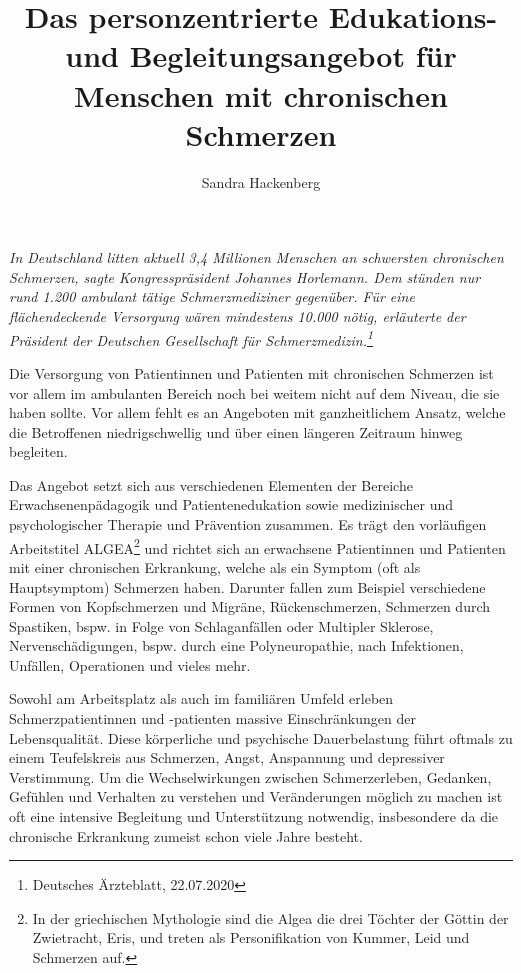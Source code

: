 \documentclass[
  parskip=half,
  DIV=11,
]{scrartcl}
\title{
    Das personzentrierte Edukations- und Begleitungsangebot für Menschen mit chronischen Schmerzen
    \textquote{ALGEA}
}
\author{Sandra Hackenberg}
\begin{document}
\maketitle

\begin{displayquote}\itshape In Deutschland litten aktuell 3,4 Millionen Menschen an schwersten
    chronischen Schmerzen, sagte Kongresspräsident Johannes Horlemann. Dem stünden nur rund 1.200
    ambulant tätige Schmerzmediziner gegenüber. Für eine flächendeckende Versorgung wären mindestens
    10.000 nötig, erläuterte der Präsident der Deutschen Gesellschaft für
    Schmerzmedizin.\footnote{Deutsches Ärzteblatt, 22.07.2020}
\end{displayquote}

\begin{multicols}{2}
Die Versorgung von Patientinnen und Patienten mit chronischen Schmerzen ist vor allem im ambulanten
Bereich noch bei weitem nicht auf dem Niveau, die sie haben sollte. Vor allem fehlt es an Angeboten
mit ganzheitlichem Ansatz, welche die Betroffenen niedrigschwellig und über einen längeren Zeitraum
hinweg begleiten.

Das Angebot setzt sich aus verschiedenen Elementen der Bereiche Erwachsenenpädagogik und Patientenedukation sowie medizinischer und psychologischer Therapie und Prävention zusammen.  Es trägt den
vorläufigen Arbeitstitel ALGEA\footnote{In der griechischen Mythologie sind die Algea die drei
Töchter der Göttin der Zwietracht, Eris, und treten als Personifikation von Kummer, Leid und
Schmerzen auf.} und richtet sich an erwachsene Patientinnen und Patienten mit einer chronischen
Erkrankung, welche als ein Symptom (oft als Hauptsymptom) Schmerzen haben. Darunter fallen zum
Beispiel verschiedene Formen von Kopfschmerzen und Migräne, Rückenschmerzen, Schmerzen durch
Spastiken, bspw. in Folge von Schlaganfällen oder Multipler Sklerose, Nervenschädigungen, bspw.
durch eine Polyneuropathie, nach Infektionen, Unfällen, Operationen und vieles mehr.

Sowohl am Arbeitsplatz als auch im familiären Umfeld erleben Schmerzpatientinnen und -patienten
massive Einschränkungen der Lebensqualität. Diese körperliche und psychische Dauerbelastung führt
oftmals zu einem Teufelskreis aus Schmerzen, Angst, Anspannung und depressiver Verstimmung. Um die Wechselwirkungen zwischen Schmerzerleben, Gedanken, Gefühlen und Verhalten zu verstehen und Veränderungen möglich zu machen ist oft eine intensive
Begleitung und Unterstützung notwendig, insbesondere da die chronische Erkrankung zumeist schon
viele Jahre besteht.


\end{multicols}
\end{document}
